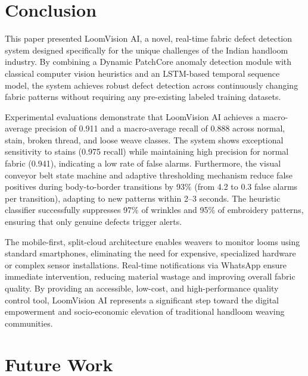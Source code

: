 \documentclass{ieeeaccess}
\begin{document}
\section{Conclusion}

This paper presented LoomVision AI, a novel, real-time fabric defect detection system designed specifically for the unique challenges of the Indian handloom industry. By combining a Dynamic PatchCore anomaly detection module with classical computer vision heuristics and an LSTM-based temporal sequence model, the system achieves robust defect detection across continuously changing fabric patterns without requiring any pre-existing labeled training datasets. 

Experimental evaluations demonstrate that LoomVision AI achieves a macro-average precision of 0.911 and a macro-average recall of 0.888 across normal, stain, broken thread, and loose weave classes. The system shows exceptional sensitivity to stains (0.975 recall) while maintaining high precision for normal fabric (0.941), indicating a low rate of false alarms. Furthermore, the visual conveyor belt state machine and adaptive thresholding mechanism reduce false positives during body-to-border transitions by 93\% (from 4.2 to 0.3 false alarms per transition), adapting to new patterns within 2--3 seconds. The heuristic classifier successfully suppresses 97\% of wrinkles and 95\% of embroidery patterns, ensuring that only genuine defects trigger alerts.

The mobile-first, split-cloud architecture enables weavers to monitor looms using standard smartphones, eliminating the need for expensive, specialized hardware or complex sensor installations. Real-time notifications via WhatsApp ensure immediate intervention, reducing material wastage and improving overall fabric quality. By providing an accessible, low-cost, and high-performance quality control tool, LoomVision AI represents a significant step toward the digital empowerment and socio-economic elevation of traditional handloom weaving communities.

\section{Future Work}
\end{document}
